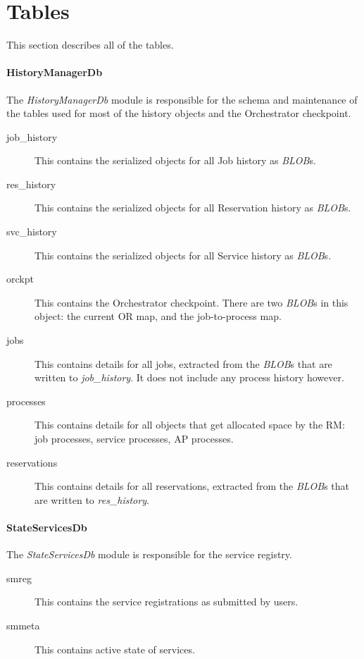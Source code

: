 \section{Tables}
    This section describes all of the tables.


    \paragraph{HistoryManagerDb} The {\em HistoryManagerDb} module is responsible for the
    schema and maintenance of the tables used for most of the history objects and the
    Orchestrator checkpoint.

       \begin{description}
          \item[job\_history] This contains the serialized objects for all Job history as {\em BLOB}s. 
          \item[res\_history] This contains the serialized objects for all Reservation history as {\em BLOB}s.
          \item[svc\_history] This contains the serialized objects for all Service history as {\em BLOB}s.
          \item[orckpt] This contains the Orchestrator checkpoint.  There are two {\em BLOB}s in this object:
            the current OR map, and the job-to-process map.
          \item[jobs] This contains details for all jobs, extracted from the {\em BLOB}s that are written
            to {\em job\_history}.  It does not include any process history however.
          \item[processes] This contains details for all objects that get allocated space by the RM:
            job processes, service processes, AP processes.
          \item[reservations] This contains details for all reservations, extracted from the {\em BLOB}s that are written
            to {\em res\_history}.
       \end{description}

   \paragraph{StateServicesDb} The {\em StateServicesDb} module is responsible for the 
   service registry.  

   \begin{description}
     \item[smreg] This contains the service registrations as submitted by users.
     \item[smmeta] This contains active state of services.
   \end{description}

